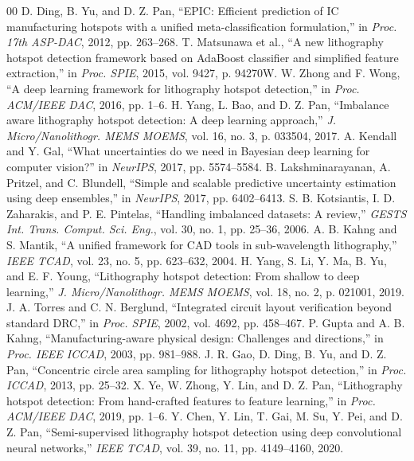 \documentclass[conference]{IEEEtran}
\begin{document}
\begin{thebibliography}{00}
 D. Ding, B. Yu, and D. Z. Pan, ``EPIC: Efficient prediction of IC manufacturing hotspots with a unified meta-classification formulation,'' in \textit{Proc. 17th ASP-DAC}, 2012, pp. 263--268.
 T. Matsunawa et al., ``A new lithography hotspot detection framework based on AdaBoost classifier and simplified feature extraction,'' in \textit{Proc. SPIE}, 2015, vol. 9427, p. 94270W.
 W. Zhong and F. Wong, ``A deep learning framework for lithography hotspot detection,'' in \textit{Proc. ACM/IEEE DAC}, 2016, pp. 1--6.
 H. Yang, L. Bao, and D. Z. Pan, ``Imbalance aware lithography hotspot detection: A deep learning approach,'' \textit{J. Micro/Nanolithogr. MEMS MOEMS}, vol. 16, no. 3, p. 033504, 2017.
 A. Kendall and Y. Gal, ``What uncertainties do we need in Bayesian deep learning for computer vision?'' in \textit{NeurIPS}, 2017, pp. 5574--5584.
 B. Lakshminarayanan, A. Pritzel, and C. Blundell, ``Simple and scalable predictive uncertainty estimation using deep ensembles,'' in \textit{NeurIPS}, 2017, pp. 6402--6413.
 S. B. Kotsiantis, I. D. Zaharakis, and P. E. Pintelas, ``Handling imbalanced datasets: A review,'' \textit{GESTS Int. Trans. Comput. Sci. Eng.}, vol. 30, no. 1, pp. 25--36, 2006.
 A. B. Kahng and S. Mantik, ``A unified framework for CAD tools in sub-wavelength lithography,'' \textit{IEEE TCAD}, vol. 23, no. 5, pp. 623--632, 2004.
 H. Yang, S. Li, Y. Ma, B. Yu, and E. F. Young, ``Lithography hotspot detection: From shallow to deep learning,'' \textit{J. Micro/Nanolithogr. MEMS MOEMS}, vol. 18, no. 2, p. 021001, 2019.
 J. A. Torres and C. N. Berglund, ``Integrated circuit layout verification beyond standard DRC,'' in \textit{Proc. SPIE}, 2002, vol. 4692, pp. 458--467.
 P. Gupta and A. B. Kahng, ``Manufacturing-aware physical design: Challenges and directions,'' in \textit{Proc. IEEE ICCAD}, 2003, pp. 981--988.
 J. R. Gao, D. Ding, B. Yu, and D. Z. Pan, ``Concentric circle area sampling for lithography hotspot detection,'' in \textit{Proc. ICCAD}, 2013, pp. 25--32.
 X. Ye, W. Zhong, Y. Lin, and D. Z. Pan, ``Lithography hotspot detection: From hand-crafted features to feature learning,'' in \textit{Proc. ACM/IEEE DAC}, 2019, pp. 1--6.
 Y. Chen, Y. Lin, T. Gai, M. Su, Y. Pei, and D. Z. Pan, ``Semi-supervised lithography hotspot detection using deep convolutional neural networks,'' \textit{IEEE TCAD}, vol. 39, no. 11, pp. 4149--4160, 2020.

\end{thebibliography}
\end{document}
